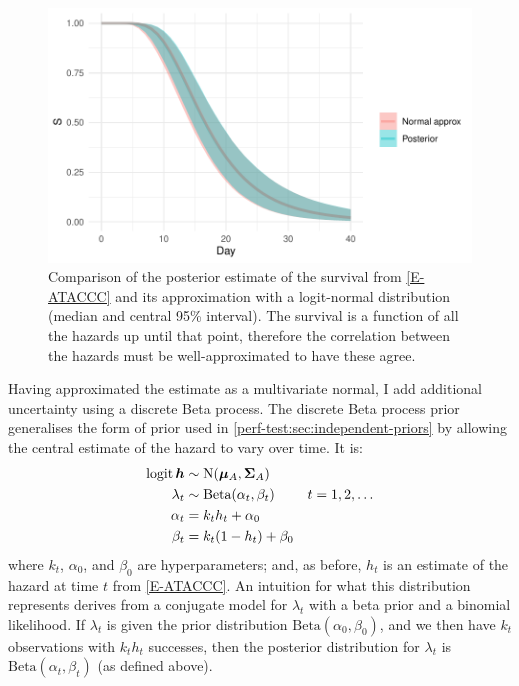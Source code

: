 \documentclass[thesis.tex]{subfiles}
\begin{document}
\begin{figure}
  \centering \includegraphics{cis-perfect-testing/ataccc-approximation-survival}
  \caption[Approximating the ATACCC posterior survival as a logit-normal]{Comparison of the posterior estimate of the survival from \cref{E-ATACCC} and its approximation with a logit-normal distribution (median and central 95\% interval). The survival is a function of all the hazards up until that point, therefore the correlation between the hazards must be well-approximated to have these agree. \label{perf-test:fig:approximate-ATACCC-survival}}
\end{figure}

Having approximated the estimate as a multivariate normal, I add additional uncertainty using a discrete Beta process.
The discrete Beta process prior~\autocite{ibrahimBayesian,sunStatisticala} generalises the form of prior used in \cref{perf-test:sec:independent-priors} by allowing the central estimate of the hazard to vary over time.
It is:
\begin{align}
  \operatorname{logit} \bm{h} &\sim \operatorname{N}(\bm{\mu}_A, \bm{\Sigma}_A) \\
  \lambda_t &\sim \text{Beta}(\alpha_t, \beta_t) &t = 1, 2, \dots \\
  \alpha_t &= k_t h_t + \alpha_0 \\
  \beta_t &= k_t (1 - h_t) + \beta_0
\end{align}
where $k_t$, $\alpha_0$, and $\beta_0$ are hyperparameters; and, as before, $h_t$ is an estimate of the hazard at time $t$ from \cref{E-ATACCC}.
An intuition for what this distribution represents derives from a conjugate model for $\lambda_t$ with a beta prior and a binomial likelihood.
If $\lambda_t$ is given the prior distribution $\text{Beta}(\alpha_0, \beta_0)$, and we then have $k_t$ observations with $k_t h_t$ successes, then the posterior distribution for $\lambda_t$ is $\text{Beta}(\alpha_t, \beta_t)$ (as defined above).
\end{document}
